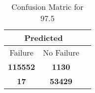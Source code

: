\begin{table}[] 
\caption{Confusion Matric for 97.5} 
\label{Table: Prediction Accuracy-DMD97.5OnlySunEKF-resetReflectionEKF-top2perfectNoFailurePrediction-Reflection} 
\centering 
\begin{tabular} 
 {@{}ccc@{}} 
\toprule 
\multicolumn{2}{c}{\textbf{Predicted}}
 \\ \midrule 
\multicolumn{1}{|c|}{Failure} & 
\multicolumn{1}{c|}{No Failure}
 \\ \midrule 
\multicolumn{1}{|c|}{\color{green}\textbf{115552}} & 
\multicolumn{1}{c|}{\color{red}\textbf{1130}}
 \\ \midrule 
\multicolumn{1}{|c|}{\color{red}\textbf{17}} & 
\multicolumn{1}{c|}{\color{green}\textbf{53429}}
 \\ \bottomrule 
\end{tabular} 
\end{table} 
